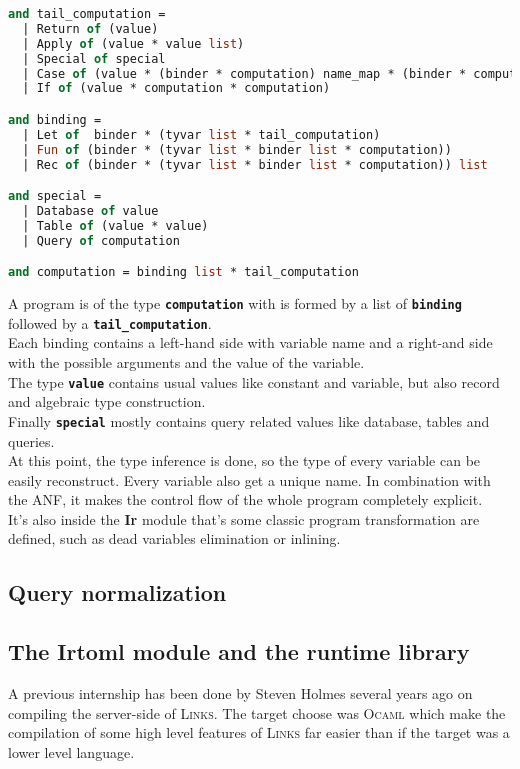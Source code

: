 \documentclass[11pt]{article}
\newcommand\mysc[1]{{\rmfamily\textsc{#1}}\xspace}
\newcommand\links{\mysc{Links}}
\newcommand\ocaml{\mysc{Ocaml}}
\newcommand\sig[1]{{\tt\bf #1}}
\newcommand\module[1]{{\bf #1}}
\begin{document}
\begin{lstlisting}[language=ML]
and tail_computation =
  | Return of (value)
  | Apply of (value * value list)
  | Special of special
  | Case of (value * (binder * computation) name_map * (binder * computation) option)
  | If of (value * computation * computation)

and binding =
  | Let of  binder * (tyvar list * tail_computation)
  | Fun of (binder * (tyvar list * binder list * computation))
  | Rec of (binder * (tyvar list * binder list * computation)) list

and special =
  | Database of value 
  | Table of (value * value)
  | Query of computation

and computation = binding list * tail_computation
\end{lstlisting}

A program is of the type \sig{computation} with is formed by a list of \sig{binding} followed by a \sig{tail\_computation}.\\
Each binding contains a left-hand side with variable name and a right-and side with the possible arguments and the value of the variable. \\
The type \sig{value} contains usual values like constant and variable, but also record and algebraic type construction.\\
Finally \sig{special} mostly contains query related values like database, tables and queries.\\

At this point, the type inference is done, so the type of every variable can be easily reconstruct. Every variable also get a unique name. In combination with the ANF, it makes the control flow of the whole program completely explicit.\\

It's also inside the \module{Ir} module that's some classic program transformation are defined, such as dead variables elimination or inlining.

\subsection{Query normalization \label{querynorm}}


\subsection{The Irtoml module and the runtime library \label{irtoml}}

A previous internship \cite{links:comp} has been done by Steven Holmes several years ago on compiling the server-side of \links. The target choose was \ocaml which make the compilation of some high level features of \links far easier than if the target was a lower level language. 
\end{document}
